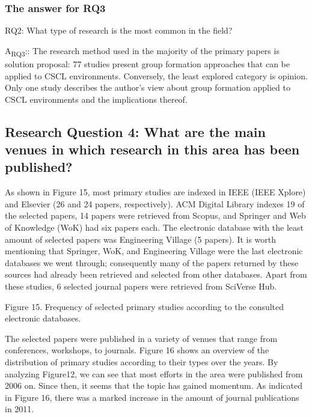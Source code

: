 \subsubsection{The answer for RQ3}

RQ2: What type of research is the most common in the field?

A\textsubscript{RQ3}:: The research method used in the majority of the primary papers is solution proposal: 77 studies present group formation approaches that can be applied to CSCL environments. Conversely, the least explored category is opinion. Only one study describes the author’s view about group formation applied to CSCL environments and the implications thereof.

\subsection{Research Question 4: What are the main venues in which research in this area has been published?}

As shown in Figure 15, most primary studies are indexed in IEEE (IEEE Xplore) and Elsevier (26 and 24 papers, respectively). ACM Digital Library indexes 19 of the selected papers, 14 papers were retrieved from Scopus, and Springer and Web of Knowledge (WoK) had six papers each. The electronic database with the least amount of selected papers was Engineering Village (5 papers). It is worth mentioning that Springer, WoK, and Engineering Village were the last electronic databases we went through; consequently many of the papers returned by these sources had already been retrieved and selected from other databases. Apart from these studies, 6 selected journal papers were retrieved from SciVerse Hub. 

Figure 15. Frequency of selected primary studies according to the consulted electronic databases.

The selected papers were published in a variety of venues that range from conferences, workshops, to journals. Figure 16 shows an overview of the distribution of primary studies according to their types over the years. By analyzing Figure12, we can see that most efforts in the area were published from 2006 on. Since then, it seems that the topic has gained momentum. As indicated in Figure 16, there was a marked increase in the amount of journal publications in 2011. 

